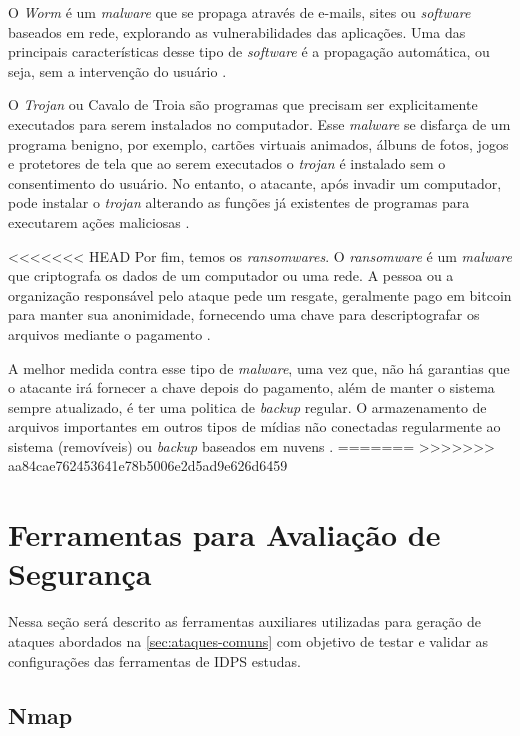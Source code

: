  O \textit{Worm} é um \textit{malware} que se propaga através de e-mails, sites ou \textit{software} baseados em rede, explorando as vulnerabilidades das aplicações. Uma das principais características desse tipo de \textit{software} é a propagação automática, ou seja, sem a intervenção do usuário \cite{detectingworm}. 

 O \textit{Trojan} ou Cavalo de Troia são programas que precisam ser explicitamente executados para serem instalados no computador. Esse \textit{malware} se disfarça de um programa benigno, por exemplo, cartões virtuais animados, álbuns de fotos, jogos e protetores de tela que ao serem executados o \textit{trojan} é instalado sem o consentimento do usuário. No entanto, o atacante, após invadir um computador, pode instalar o \textit{trojan} alterando as funções já existentes de programas para executarem ações maliciosas \cite{certs-malwares}.

<<<<<<< HEAD
 Por fim, temos os \textit{ransomwares}. O \textit{ransomware} é um \textit{malware} que criptografa os dados de um computador ou uma rede. A pessoa ou a organização responsável pelo ataque pede um resgate, geralmente pago em bitcoin para manter sua anonimidade, fornecendo uma chave para descriptografar os arquivos mediante o pagamento \cite{ransomware:matt}.

 A melhor medida contra esse tipo de \textit{malware}, uma vez que, não há garantias que o atacante irá fornecer a chave depois do pagamento, além de manter o sistema sempre atualizado, é ter uma politica de \textit{backup} regular. O armazenamento de arquivos importantes em outros tipos de mídias não conectadas regularmente ao sistema (removíveis) ou \textit{backup} baseados em nuvens \cite{ransomware:matt}.
=======
>>>>>>> aa84cae762453641e78b5006e2d5ad9e626d6459

 \section{Ferramentas para Avaliação de Segurança} \label{sec:ferramentas}

 Nessa seção será descrito as ferramentas auxiliares utilizadas para geração de ataques abordados na \autoref{sec:ataques-comuns} com objetivo de testar e validar as configurações das ferramentas de IDPS estudas. 

 \subsection{Nmap} \label{sec:nmap}

